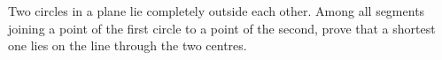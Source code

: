Two circles in a plane lie completely outside each other. Among all segments joining a point of the first circle to a point of the second, prove that a shortest one lies on the line through the two centres.
